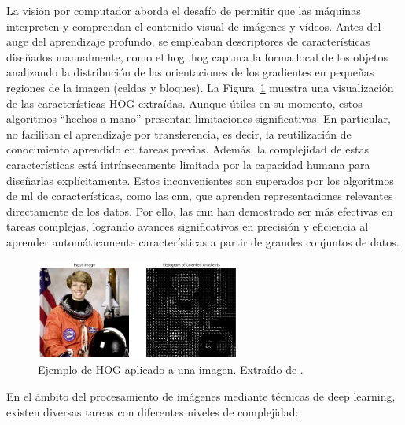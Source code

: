 \documentclass[11pt,spanish,listoffigures,listoftables]{tfgetsinf}
\begin{document}
La visión por computador aborda el desafío de permitir que las máquinas interpreten y comprendan el contenido visual de imágenes y vídeos. Antes del auge del aprendizaje profundo, se empleaban descriptores de características diseñados manualmente, como el \gls{hog}. \gls{hog} captura la forma local de los objetos analizando la distribución de las orientaciones de los gradientes en pequeñas regiones de la imagen (celdas y bloques). La Figura~\ref{fig:hog} muestra una visualización de las características HOG extraídas. Aunque útiles en su momento, estos algoritmos ``hechos a mano'' presentan limitaciones significativas. En particular, no facilitan el aprendizaje por transferencia, es decir, la reutilización de conocimiento aprendido en tareas previas. Además, la complejidad de estas características está intrínsecamente limitada por la capacidad humana para diseñarlas explícitamente. Estos inconvenientes son superados por los algoritmos de \gls{ml} de características, como las \gls{cnn}, que aprenden representaciones relevantes directamente de los datos. Por ello, las \gls{cnn} han demostrado ser más efectivas en tareas complejas, logrando avances significativos en precisión y eficiencia al aprender automáticamente características a partir de grandes conjuntos de datos.

\begin{figure}[H]
   \centering
   \includegraphics[width=0.6\textwidth]{images/estado_del_arte/HOG_example.png}
   \caption[Ejemplo de HOG aplicado a una imagen]{Ejemplo de HOG aplicado a una imagen. Extraído de \cite{opengenusHOG}.}
   \label{fig:hog}
\end{figure}


En el ámbito del procesamiento de imágenes mediante técnicas de deep learning, existen diversas tareas con diferentes niveles de complejidad:
\end{document}
